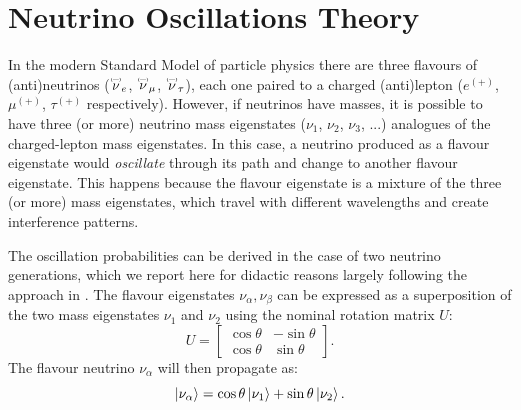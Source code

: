 \section{Neutrino Oscillations Theory}
In the modern Standard Model of particle physics there are three flavours of (anti)neutrinos ($\overset{\textbf{\fontsize{3pt}{3pt}\selectfont(---)}}{\nu}_{e}$, $\overset{\textbf{\fontsize{3pt}{3pt}\selectfont(---)}}{\nu}_{\mu}$, $\overset{\textbf{\fontsize{3pt}{3pt}\selectfont(---)}}{\nu}_{\tau}$), each one paired to a charged (anti)lepton ($e^{(+)}$, $\mu^{(+)}$, $\tau^{(+)}$ respectively). 
However, if neutrinos have masses, it is possible to have three (or more) neutrino mass eigenstates ($\nu_{1}$, $\nu_{2}$, $\nu_{3}$, ...) analogues of the charged-lepton mass eigenstates. 
In this case, a neutrino produced as a flavour eigenstate would \emph{oscillate} through its path and change to another flavour eigenstate. This happens because the flavour eigenstate is a mixture of the three (or more) mass eigenstates, which travel with different wavelengths and create interference patterns. 

The oscillation probabilities can be derived in the case of two neutrino generations, which we report here for didactic reasons largely following the approach in \cite{deGouvea:2004gd}. The flavour eigenstates $\nu_{\alpha}, \nu_{\beta}$ can be expressed as a superposition of the two mass eigenstates $\nu_1$ and $\nu_2$ using the nominal rotation matrix $U$:
\begin{equation}
U = \begin{bmatrix}
    \cos\theta & -\sin\theta \\
    \cos\theta & \sin\theta
    \end{bmatrix}.
\end{equation}
The flavour neutrino $\nu_{\alpha}$ will then propagate as: 
\begin{equation}
    \ket{\nu_{\alpha}} = \cos\theta\ket{\nu_{1}}+\sin\theta\ket{\nu_{2}}.
\end{equation}

